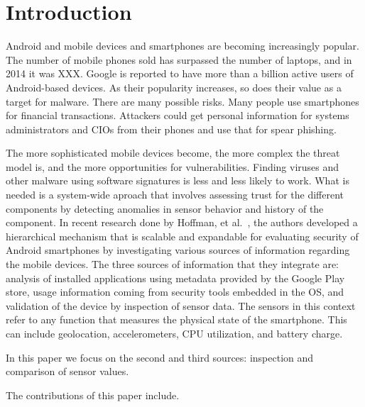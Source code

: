 \section{Introduction}

Android and mobile devices and smartphones are becoming increasingly popular.  The number of mobile phones
sold has surpassed the number of laptops, and in 2014 it was XXX. Google is reported to have more than
a billion active users of Android-based devices.  As their popularity increases, so does their value as
a target for malware.  There are many possible risks.
Many people use smartphones for financial transactions.  Attackers could get personal
information for systems administrators and CIOs from their phones and use that for spear phishing.  

The more sophisticated mobile devices become, the more complex the threat model is, and the more opportunities
for vulnerabilities.  Finding viruses and other malware using software signatures is less and less likely to
work.  What is needed is a system-wide  aproach that involves assessing trust for the different
components by detecting anomalies in sensor behavior and history of the component.  
In recent research done by Hoffman, et al.~\cite{hoffman}, the authors developed a hierarchical 
mechanism that is scalable and expandable for evaluating security of
Android smartphones by investigating various sources of information regarding 
the mobile devices. 
%
The three sources of information that they integrate are:
analysis of installed applications using metadata provided by the Google Play store,
usage information coming from security tools embedded in the OS, and 
validation of the device by inspection of sensor data.  
The sensors in this context refer to any function that
measures the physical state of the smartphone.  This can include geolocation, accelerometers, CPU 
utilization, and battery charge.

In this paper we focus on the second and third sources: inspection and comparison of sensor values.

The contributions of this paper include. 